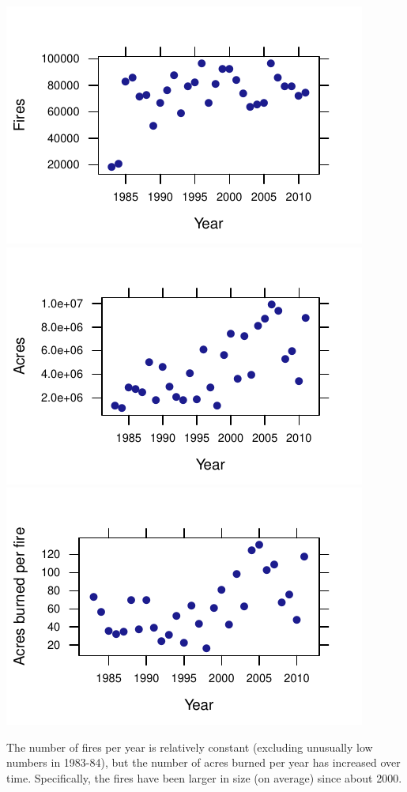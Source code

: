 \documentclass[twoside]{book}\usepackage[]{graphicx}\usepackage[]{xcolor}
\makeatletter
\def\maxwidth{ %
  \ifdim\Gin@nat@width>\linewidth
    \linewidth
  \else
    \Gin@nat@width
  \fi
}
\newenvironment{knitrout}{}{} %
\makeatother
\begin{document}
\begin{solution}
\begin{knitrout}
{\centering \includegraphics[width=\maxwidth]{figures/fig-unnamed-chunk-32-1} 
\includegraphics[width=\maxwidth]{figures/fig-unnamed-chunk-32-2} 
\includegraphics[width=\maxwidth]{figures/fig-unnamed-chunk-32-3} 

}



\end{knitrout}

The number of fires per year is relatively constant (excluding unusually low numbers in 1983-84), but the number of acres burned per year has increased over time.  Specifically, the fires have been larger in size (on average) since about 2000.
\end{solution}
\end{document}
